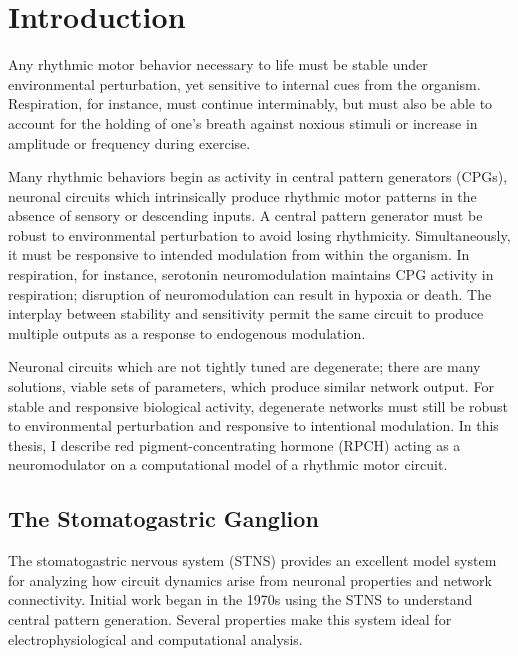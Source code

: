 \chapter{Introduction}\label{ch:introduction}

Any rhythmic motor behavior necessary to life must be stable under environmental perturbation, yet sensitive to internal cues from the organism. Respiration, for instance, must continue interminably, but must also be able to account for the holding of one's breath against noxious stimuli or increase in amplitude or frequency during exercise. 

Many rhythmic behaviors begin as activity in central pattern generators (\acsp{CPG}), neuronal circuits which intrinsically produce rhythmic motor patterns in the absence of sensory or descending inputs\autocite{MarderCentralpatterngenerators2001}. A central pattern generator must be robust to environmental perturbation to avoid losing rhythmicity. Simultaneously, it must be responsive to intended modulation from within the organism. In respiration, for instance, serotonin neuromodulation maintains \acs{CPG} activity in respiration; disruption of neuromodulation can result in hypoxia or death\autocite{DoiNeuromodulationOrchestrationRespiratory2008,PenaEndogenousActivationSerotonin2A2002}. The interplay between stability and sensitivity permit the same circuit to produce multiple outputs as a response to endogenous modulation\autocite{Nusbaumrolescotransmissionneural2001}.

Neuronal circuits which are not tightly tuned are degenerate; there are many solutions, viable sets of parameters, which produce similar network output\autocite{TononiMeasuresdegeneracyredundancy1999,EdelmanDegeneracycomplexitybiological2001,WhitacreDegeneracydesignprinciple2010,DrionIonchanneldegeneracy2015}. For stable and responsive biological activity, degenerate networks must still be robust to environmental perturbation and responsive to intentional modulation. In this thesis, I describe red pigment-concentrating hormone (\acs{RPCH}) acting as a neuromodulator on a computational model of a rhythmic motor circuit.

\section{The Stomatogastric Ganglion}
The stomatogastric nervous system (\acs{STNS}) provides an excellent model system for analyzing how circuit dynamics arise from neuronal properties and network connectivity\autocite{MarderPrinciplesrhythmicmotor1996}. Initial work began in the 1970s using the \acs{STNS} to understand central pattern generation\autocite{MaynardSimplernetworks1972,HartlinePatterngenerationlobster1979,RaperNonimpulsemediatedsynaptictransmission1979}. Several properties make this system ideal for electrophysiological and computational analysis.

